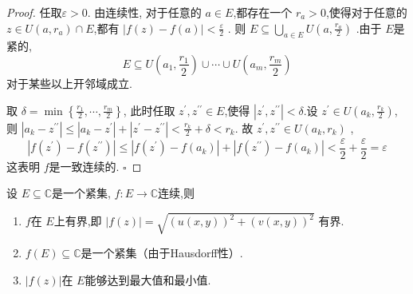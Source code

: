 \documentclass[../../复变函数.tex]{subfiles}
\begin{document}
\begin{proof}
    任取\(  \varepsilon >0  \).
    由连续性, 对于任意的 \(  a \in E  \),都存在一个 \(  r_{a}>0   \),使得对于任意的 \(  z \in U\left( a,r_{a} \right)\cap E   \),都有 
    \(  \left| f\left( z \right)-f\left( a \right)   \right|< \frac{\varepsilon  }{2 }    \)    .
    则 \(  E\subseteq  \bigcup_{a\in E} U\left( a, \frac{r_{a} }{ 2}  \right)    \) .由于 \(  E  \)是紧的,  \[
    E \subseteq  U\left( a_1,\frac{r_1 }{2 }  \right)\cup \cdots \cup  U\left( a_{m}, \frac{r_{m} }{2 }  \right)  
    \]对于某些以上开邻域成立.
    
    取 \(   \delta   =  \min \left\{  \frac{r_1 }{2 },\cdots ,\frac{r_{m} }{2 }   \right\}  \), 
    此时任取 \(  z^{\prime} ,z ^{\prime \prime}  \in E  \),使得 \(  \left| z^{\prime} , z ^{\prime \prime}  \right|<  \delta     \).设 \(  z^{\prime} \in U\left( a_{k}, \frac{r_{k} }{2 }  \right)   \),则 \(  \left| a_{k}-z ^{\prime \prime}  \right|\le  \left| a_{k}- z^{\prime}  \right|+ \left| z^{\prime} - z ^{\prime \prime}  \right|   < \frac{r_{k} }{2 }+  \delta  <r_{k}   \).      
    故 \(  z^{\prime} ,z^{\prime \prime} \in U\left( a_{k},r_{k} \right)   \) , \[
    \left| f\left( z^{\prime}  \right)-f\left( z^{\prime \prime}  \right)   \right|\le  \left| f\left( z^{\prime}  \right)-f\left( a_{k} \right)   \right|+  \left| f\left( z^{\prime \prime}  \right)-f\left( a_{k} \right)   \right|< \frac{\varepsilon  }{2 }+ \frac{\varepsilon  }{ 2}= \varepsilon      
    \]这表明 \(  f  \)是一致连续的. 
    \hfill $\square$
\end{proof}



\begin{theorem}
    设 \(  E\subseteq \mathbb{C}   \)是一个紧集, \(  f: E\to \mathbb{C}   \)连续,则
    \begin{enumerate}
        \item  \(  f  \)在 \(  E  \)上有界,即 \(  \left| f\left( z \right)  \right| =  \sqrt{\left( u\left( x,y \right)  \right)^{2}+ \left( v\left( x,y \right)  \right)^{2}  }   \)  有界.
        \item  \(  f\left( E \right)\subseteq \mathbb{C}    \)是一个紧集（由于Hausdorff性）.  
        \item  \(  \left| f\left( z \right)  \right|   \)在 \(  E  \)能够达到最大值和最小值.  
    \end{enumerate}
    
\end{theorem}
\end{document}
